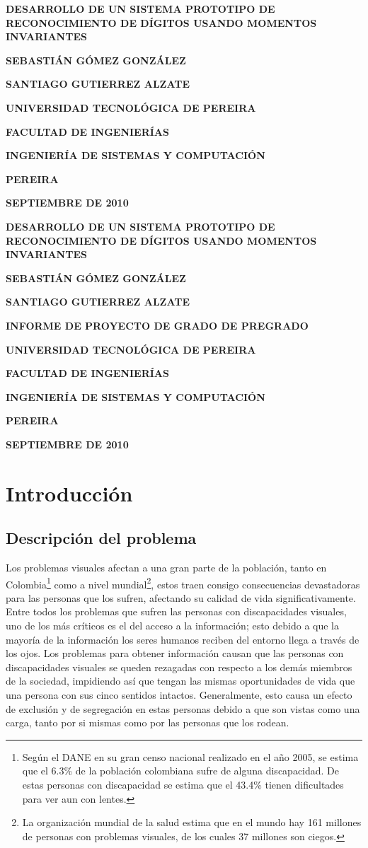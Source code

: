 \documentclass[a4paper, 11pt, oneside]{report}
\newcommand\portada{
	\begin{titlepage}
		\begin{center}
			{\large \bf DESARROLLO DE UN SISTEMA PROTOTIPO DE RECONOCIMIENTO DE DÍGITOS USANDO MOMENTOS INVARIANTES }
			\vfill
			{\large\bf SEBASTIÁN GÓMEZ GONZÁLEZ \par}
			{\large\bf SANTIAGO GUTIERREZ ALZATE \par}
			\vfill
			{\large\bf UNIVERSIDAD TECNOLÓGICA DE PEREIRA  \par}
			{\large\bf FACULTAD DE INGENIERÍAS \par}
			{\large\bf INGENIERÍA DE SISTEMAS Y COMPUTACIÓN \par}
			{\large\bf PEREIRA\par}
			{\large\bf SEPTIEMBRE DE 2010 \par}
		\end{center}
	\end{titlepage}
}
\newcommand\contraportada{
	\begin{titlepage}
		\begin{center}
			{\large \bf DESARROLLO DE UN SISTEMA PROTOTIPO DE RECONOCIMIENTO DE DÍGITOS USANDO MOMENTOS INVARIANTES }
			\vfill
			{\large\bf SEBASTIÁN GÓMEZ GONZÁLEZ \par}
			{\large\bf SANTIAGO GUTIERREZ ALZATE \par}
			\vfill
			{\large\bf INFORME DE PROYECTO DE GRADO DE PREGRADO\par}
			\vfill
			{\large\bf UNIVERSIDAD TECNOLÓGICA DE PEREIRA  \par}
			{\large\bf FACULTAD DE INGENIERÍAS \par}
			{\large\bf INGENIERÍA DE SISTEMAS Y COMPUTACIÓN \par}
			{\large\bf PEREIRA\par}
			{\large\bf SEPTIEMBRE DE 2010 \par}
		\end{center}
	\end{titlepage}
}
\begin{document}
\portada
\contraportada

\tableofcontents

\listoffigures

\listoftables

\chapter{Introducción}
\label{chap:intro}

\section{Descripción del problema}

Los problemas visuales afectan a una gran parte de la población, tanto en Colombia\footnote{Según el DANE en su gran censo nacional realizado en el año 2005, se estima que el 6.3\% de la población colombiana sufre de alguna discapacidad. De estas personas con discapacidad se estima que el 43.4\% tienen dificultades para ver aun con lentes.} como a nivel mundial\footnote{La organización mundial de la salud estima que en el mundo hay 161 millones de personas con problemas visuales, de los cuales 37 millones son ciegos.}, estos traen consigo consecuencias devastadoras para las personas que los sufren, afectando su calidad de vida significativamente. Entre todos los problemas que sufren las personas con discapacidades visuales, uno de los más críticos es el del acceso a la información; esto debido a que la mayoría de la información los seres humanos reciben del entorno llega a través de los ojos. Los problemas para obtener información causan que las personas con discapacidades visuales se queden rezagadas con respecto a los demás miembros de la sociedad, impidiendo así que tengan las mismas oportunidades de vida que una persona con sus cinco sentidos intactos. Generalmente, esto causa un efecto de exclusión y de segregación en estas personas debido a que son vistas como una carga, tanto por si mismas como por las personas que los rodean. 
\end{document}
